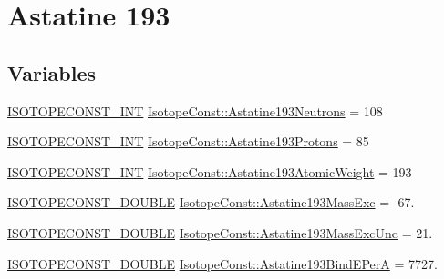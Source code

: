 \hypertarget{group___isotope_const-_astatine-_at193}{}\section{Astatine 193}
\label{group___isotope_const-_astatine-_at193}
\subsection*{Variables}
\begin{DoxyCompactItemize}
\item 
\mbox{\hyperlink{group___isotope_const-_macros_ga5f18360b3e99483a35c32d789e62621c}{I\+S\+O\+T\+O\+P\+E\+C\+O\+N\+S\+T\+\_\+\+I\+NT}} \mbox{\hyperlink{group___isotope_const-_astatine-_at193_gaaf86a3c0475a6f08fb553b487c3ecc03}{Isotope\+Const\+::\+Astatine193\+Neutrons}} = 108
\item 
\mbox{\hyperlink{group___isotope_const-_macros_ga5f18360b3e99483a35c32d789e62621c}{I\+S\+O\+T\+O\+P\+E\+C\+O\+N\+S\+T\+\_\+\+I\+NT}} \mbox{\hyperlink{group___isotope_const-_astatine-_at193_ga3ff3f461960c59fb98dbad8bbe536e5b}{Isotope\+Const\+::\+Astatine193\+Protons}} = 85
\item 
\mbox{\hyperlink{group___isotope_const-_macros_ga5f18360b3e99483a35c32d789e62621c}{I\+S\+O\+T\+O\+P\+E\+C\+O\+N\+S\+T\+\_\+\+I\+NT}} \mbox{\hyperlink{group___isotope_const-_astatine-_at193_gaa306c7fb0b0069b64e61b3b573fa7235}{Isotope\+Const\+::\+Astatine193\+Atomic\+Weight}} = 193
\item 
\mbox{\hyperlink{group___isotope_const-_macros_ga8f45a7272ce02c0b4c65c44636ed719a}{I\+S\+O\+T\+O\+P\+E\+C\+O\+N\+S\+T\+\_\+\+D\+O\+U\+B\+LE}} \mbox{\hyperlink{group___isotope_const-_astatine-_at193_ga5b2e9b14b1988b27151381763813cfba}{Isotope\+Const\+::\+Astatine193\+Mass\+Exc}} = -\/67.
\item 
\mbox{\hyperlink{group___isotope_const-_macros_ga8f45a7272ce02c0b4c65c44636ed719a}{I\+S\+O\+T\+O\+P\+E\+C\+O\+N\+S\+T\+\_\+\+D\+O\+U\+B\+LE}} \mbox{\hyperlink{group___isotope_const-_astatine-_at193_ga1d665d2d941628954f633910761f3b50}{Isotope\+Const\+::\+Astatine193\+Mass\+Exc\+Unc}} = 21.
\item 
\mbox{\hyperlink{group___isotope_const-_macros_ga8f45a7272ce02c0b4c65c44636ed719a}{I\+S\+O\+T\+O\+P\+E\+C\+O\+N\+S\+T\+\_\+\+D\+O\+U\+B\+LE}} \mbox{\hyperlink{group___isotope_const-_astatine-_at193_ga66c2742eac6db5c47b2747ed48136e5d}{Isotope\+Const\+::\+Astatine193\+Bind\+E\+PerA}} = 7727.
\item 

\end{DoxyCompactItemize}
